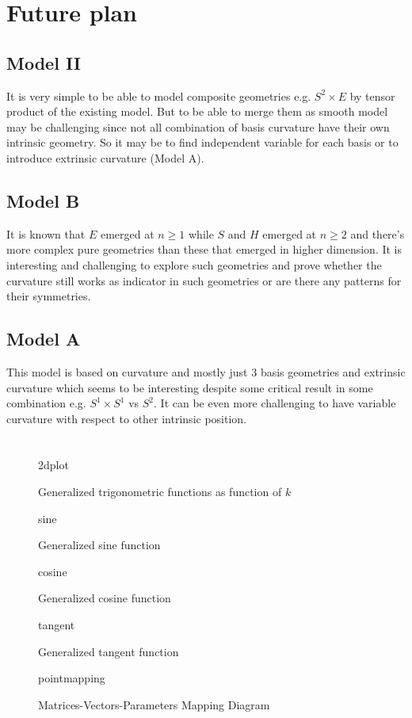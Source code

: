 \documentclass[stu, babel, american, biblatex, a4paper, draftall]{apa7}
\newcommand{\insertstandalone}[2]{{#2}}
\newcommand{\insertstandalone}[2]{\texttt{[image: \#1/\#2.pdf]}}
\begin{document}
\section{Future plan}
\subsection{Model II}
It is very simple to be able to model composite geometries e.g. $S^2 \times E$ by tensor product of the existing model. But to be able to merge them as smooth model may be challenging since not all combination of basis curvature have their own intrinsic geometry. So it may be to find independent variable for each basis or to introduce extrinsic curvature (Model A).
\subsection{Model B}
It is known that $E$ emerged at $n\ge1$ while $S$ and $H$ emerged at $n\ge2$ and there's more complex pure geometries than these that emerged in higher dimension. It is interesting and challenging to explore such geometries and prove whether the curvature still works as indicator in such geometries or are there any patterns for their symmetries.
\subsection{Model A}
This model is based on curvature and mostly just 3 basis geometries and extrinsic curvature which seems to be interesting despite some critical result in some combination e.g. $S^1 \times S^1$ vs $S^2$. It can be even more challenging to have variable curvature with respect to other intrinsic position.
\section*{}
\printbibliography
\begin{figure}
    \centering
    \insertstandalone{figures}{2dplot}
    \caption{Generalized trigonometric functions as function of $k$}\label{TrigonometryPlotted}
\end{figure}
\begin{figure}
    \centering
    \insertstandalone{figures}{sine}
    \caption{Generalized sine function}\label{TrigonometrySinePlotted}
\end{figure}
\begin{figure}
    \centering
    \insertstandalone{figures}{cosine}
    \caption{Generalized cosine function}\label{TrigonometryCosinePlotted}
\end{figure}
\begin{figure}
    \centering
    \insertstandalone{figures}{tangent}
    \caption{Generalized tangent function}\label{TrigonometryTangentPlotted}
\end{figure}
\begin{figure}
    \centering
    \insertstandalone{figures}{pointmapping}
    \caption{Matrices-Vectors-Parameters Mapping Diagram}\label{PointMappingDiagram}
\end{figure}
\end{document}
